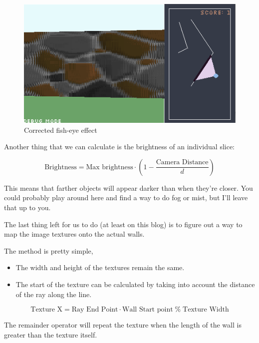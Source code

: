 \begin{figure}[!ht]
    \centering
    \includegraphics[width=\textwidth]{./images/no-fish-eye.png}
    \caption{Corrected fish-eye effect}
    \label{fig:fish-eye-corrected}
\end{figure}

Another thing that we can calculate is the brightness of an individual slice:

\begin{equation}
    \text{Brightness} = \text{Max brightness} \cdot (1 - \frac{\text{Camera Distance}}{d})
\end{equation}

This means that farther objects will appear darker than when they're closer. You could probably play around here and find a way to do fog or mist, but I'll leave that up to you.

The last thing left for us to do (at least on this blog) is to figure out a way to map the image textures onto the actual walls.

The method is pretty simple,

\begin{itemize}
    \item The width and height of the textures remain the same.
    \item The start of the texture can be calculated by taking into account the distance of the ray along the line.
\end{itemize}

\begin{equation}
    \text{Texture X} = \text{Ray End Point} \cdot \text{Wall Start point} \; \% \; \text{Texture Width}
\end{equation}

The remainder operator will repeat the texture when the length of the wall is greater than the texture itself.

